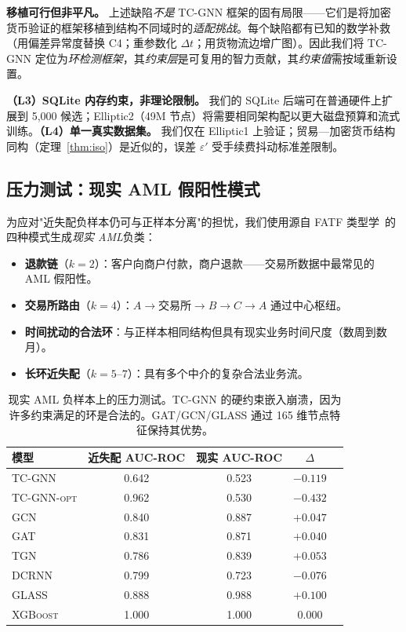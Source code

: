 \documentclass[journal,onecolumn]{IEEEtran}
\newcommand{\eps}{\varepsilon}
\begin{document}
\textbf{移植可行但非平凡。} 上述缺陷\emph{不是} TC-GNN 框架的固有局限——它们是将加密货币验证的框架移植到结构不同域时的\emph{适配挑战}。每个缺陷都有已知的数学补救（用偏差异常度替换 C4；重参数化 $\Delta t$；用货物流边增广图）。因此我们将 TC-GNN 定位为\emph{环检测框架}，其\emph{约束层}是可复用的智力贡献，其\emph{约束值}需按域重新设置。

\textbf{（L3）SQLite 内存约束，非理论限制。} 我们的 SQLite 后端可在普通硬件上扩展到 5{,}000 候选；Elliptic2（49M 节点）将需要相同架构配以更大磁盘预算和流式训练。\textbf{（L4）单一真实数据集。} 我们仅在 Elliptic1 上验证；贸易—加密货币结构同构（定理~\ref{thm:iso}）是近似的，误差 $\eps'$ 受手续费抖动标准差限制。

\subsection{压力测试：现实 AML 假阳性模式}
\label{sec:exp-stress}

为应对"近失配负样本仍可与正样本分离"的担忧，我们使用源自 FATF 类型学~\cite{fatfTypologies2022}的四种模式生成\emph{现实 AML}负类：

\begin{itemize}
\item \textbf{退款链}（$k{=}2$）：客户向商户付款，商户退款——交易所数据中最常见的 AML 假阳性。
\item \textbf{交易所路由}（$k{=}4$）：$A \to \text{交易所} \to B \to C \to A$ 通过中心枢纽。
\item \textbf{时间扰动的合法环}：与正样本相同结构但具有现实业务时间尺度（数周到数月）。
\item \textbf{长环近失配}（$k{=}5$--$7$）：具有多个中介的复杂合法业务流。
\end{itemize}

\begin{table}[t]
\centering
\caption{现实 AML 负样本上的压力测试。TC-GNN 的硬约束嵌入崩溃，因为许多约束满足的环是合法的。GAT/GCN/GLASS 通过 165 维节点特征保持其优势。}
\label{tab:realistic}
\small
\begin{tabular}{lcccc}
\toprule
\textbf{模型} & \textbf{近失配 AUC-ROC} & \textbf{现实 AUC-ROC} & $\Delta$ \\
\midrule
\textsc{TC-GNN}      & 0.642 & 0.523 & $-0.119$ \\
\textsc{TC-GNN-opt} & 0.962 & 0.530 & $-0.432$ \\
\textsc{GCN}         & 0.840 & 0.887 & $+0.047$ \\
\textsc{GAT}         & 0.831 & 0.871 & $+0.040$ \\
\textsc{TGN}         & 0.786 & 0.839 & $+0.053$ \\
\textsc{DCRNN}       & 0.799 & 0.723 & $-0.076$ \\
\textsc{GLASS}       & 0.888 & 0.988 & $+0.100$ \\
\textsc{XGBoost}     & 1.000 & 1.000 &  $0.000$ \\
\bottomrule
\end{tabular}
\end{table}
\end{document}
